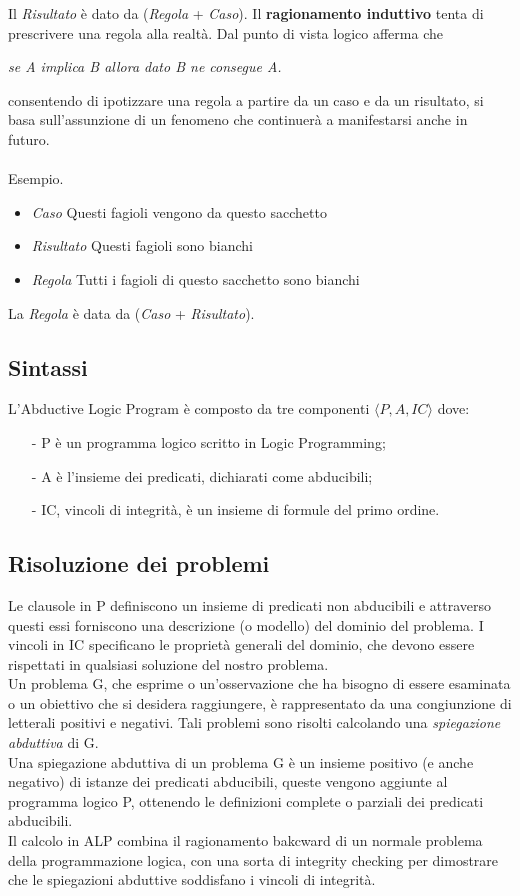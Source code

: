 \documentclass[a4paper,12pt]{report}
\begin{document}
Il \textit{Risultato} è dato da (\textit{Regola} + \textit{Caso}).
\newpage
Il \textbf{ragionamento induttivo} tenta di prescrivere una regola alla realtà. Dal punto di vista logico afferma che
\begin{center}
    \textit{se A implica B allora dato B ne consegue A.}
\end{center}
consentendo di ipotizzare una regola a partire da un caso e da un risultato, si basa sull'assunzione di un fenomeno che continuerà a manifestarsi anche in futuro.\\ \\
Esempio.
\begin{itemize}
    \item \textit{Caso} Questi fagioli vengono da questo sacchetto
    \item \textit{Risultato} Questi fagioli sono bianchi
    \item \textit{Regola} Tutti i fagioli di questo sacchetto sono bianchi
\end{itemize}
La \textit{Regola} è data da (\textit{Caso} + \textit{Risultato}).
\subsection{Sintassi}
L'Abductive Logic Program è composto da tre componenti $\langle P,A,IC \rangle$ dove:
\begin{itemize}
    \item[-]P è un programma logico scritto in Logic Programming;
    \item[-]A è l'insieme dei predicati, dichiarati come abducibili;
    \item[-]IC, vincoli di integrità, è un insieme di formule del primo ordine.
\end{itemize}
\subsection{Risoluzione dei problemi}
Le clausole in P definiscono un insieme di predicati non abducibili e attraverso questi essi forniscono una descrizione (o modello) del dominio del problema. I vincoli in IC specificano le proprietà generali del dominio, che devono essere rispettati in qualsiasi soluzione del nostro problema.
\\Un problema G, che esprime o un'osservazione che ha bisogno di essere esaminata o un obiettivo che si desidera raggiungere, è rappresentato da una congiunzione di letterali positivi e negativi. Tali problemi sono risolti calcolando una \textit{spiegazione abduttiva} di G.\\
Una spiegazione abduttiva di un problema G è un insieme positivo (e anche negativo) di istanze dei predicati abducibili, queste vengono aggiunte al programma logico P, ottenendo le definizioni complete o parziali dei predicati abducibili.\\
Il calcolo in ALP combina il ragionamento bakcward di un normale problema della programmazione logica, con una sorta di integrity checking per dimostrare che le spiegazioni abduttive soddisfano i vincoli di integrità.
\end{document}
